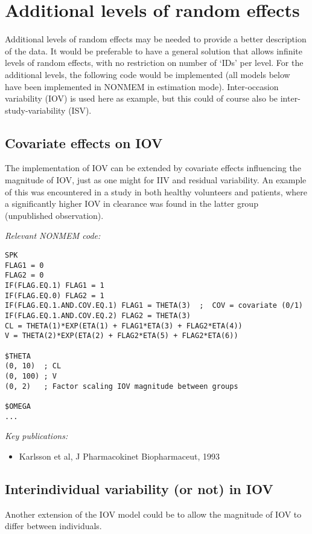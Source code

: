 \documentclass[a4paper,11pt]{article}
\begin{document}
\section{Additional levels of random effects}
Additional levels of random effects may be needed to provide a better
description of the data. It would be preferable to have a general
solution that allows infinite levels of random effects, with no
restriction on number of `IDs' per level. For the additional levels,
the following code would be implemented (all models below have been
implemented in NONMEM in estimation mode). Inter-occasion variability
(IOV) is used here as example, but this could of course also be
inter-study-variability (ISV).

\subsection{Covariate effects on IOV}
The implementation of IOV can be extended by covariate effects
influencing the magnitude of IOV, just as one might for IIV and
residual variability. An example of this was encountered in a study in
both healthy volunteers and patients, where a significantly higher IOV
in clearance was found in the latter group (unpublished observation).

\vspace{10pt}

\noindent \emph{Relevant NONMEM code:}
\begin{lstlisting}
SPK
FLAG1 = 0
FLAG2 = 0
IF(FLAG.EQ.1) FLAG1 = 1
IF(FLAG.EQ.0) FLAG2 = 1
IF(FLAG.EQ.1.AND.COV.EQ.1) FLAG1 = THETA(3)  ;  COV = covariate (0/1)
IF(FLAG.EQ.1.AND.COV.EQ.2) FLAG2 = THETA(3)
CL = THETA(1)*EXP(ETA(1) + FLAG1*ETA(3) + FLAG2*ETA(4))
V = THETA(2)*EXP(ETA(2) + FLAG2*ETA(5) + FLAG2*ETA(6))

$THETA
(0, 10)  ; CL
(0, 100) ; V
(0, 2)   ; Factor scaling IOV magnitude between groups

$OMEGA
...
\end{lstlisting}

\noindent \emph{Key publications:}
\begin{itemize}
\item Karlsson et al, J Pharmacokinet Biopharmaceut, 1993
\end{itemize}

\subsection{Interindividual variability (or not) in IOV}
Another extension of the IOV model could be to allow the magnitude of
IOV to differ between individuals.
\end{document}
